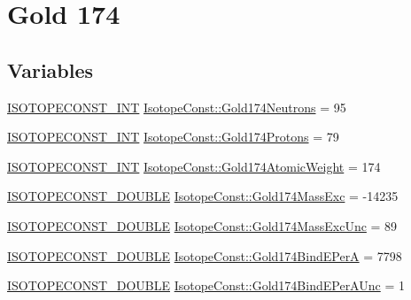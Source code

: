\hypertarget{group___isotope_const-_gold-_au174}{}\section{Gold 174}
\label{group___isotope_const-_gold-_au174}
\subsection*{Variables}
\begin{DoxyCompactItemize}
\item 
\mbox{\hyperlink{group___isotope_const-_macros_ga5f18360b3e99483a35c32d789e62621c}{I\+S\+O\+T\+O\+P\+E\+C\+O\+N\+S\+T\+\_\+\+I\+NT}} \mbox{\hyperlink{group___isotope_const-_gold-_au174_gac1ce7bd28beabdd442582b47f16205e3}{Isotope\+Const\+::\+Gold174\+Neutrons}} = 95
\item 
\mbox{\hyperlink{group___isotope_const-_macros_ga5f18360b3e99483a35c32d789e62621c}{I\+S\+O\+T\+O\+P\+E\+C\+O\+N\+S\+T\+\_\+\+I\+NT}} \mbox{\hyperlink{group___isotope_const-_gold-_au174_gad267fb6573d49a48a0ab21f8a7b635c2}{Isotope\+Const\+::\+Gold174\+Protons}} = 79
\item 
\mbox{\hyperlink{group___isotope_const-_macros_ga5f18360b3e99483a35c32d789e62621c}{I\+S\+O\+T\+O\+P\+E\+C\+O\+N\+S\+T\+\_\+\+I\+NT}} \mbox{\hyperlink{group___isotope_const-_gold-_au174_ga8fef7ecbe47c6800dd0530a676a3bb7c}{Isotope\+Const\+::\+Gold174\+Atomic\+Weight}} = 174
\item 
\mbox{\hyperlink{group___isotope_const-_macros_ga8f45a7272ce02c0b4c65c44636ed719a}{I\+S\+O\+T\+O\+P\+E\+C\+O\+N\+S\+T\+\_\+\+D\+O\+U\+B\+LE}} \mbox{\hyperlink{group___isotope_const-_gold-_au174_gaee66910d89ba2f9655a827065609aada}{Isotope\+Const\+::\+Gold174\+Mass\+Exc}} = -\/14235
\item 
\mbox{\hyperlink{group___isotope_const-_macros_ga8f45a7272ce02c0b4c65c44636ed719a}{I\+S\+O\+T\+O\+P\+E\+C\+O\+N\+S\+T\+\_\+\+D\+O\+U\+B\+LE}} \mbox{\hyperlink{group___isotope_const-_gold-_au174_gad8bb95c6bb87e60864a98564ea0b2782}{Isotope\+Const\+::\+Gold174\+Mass\+Exc\+Unc}} = 89
\item 
\mbox{\hyperlink{group___isotope_const-_macros_ga8f45a7272ce02c0b4c65c44636ed719a}{I\+S\+O\+T\+O\+P\+E\+C\+O\+N\+S\+T\+\_\+\+D\+O\+U\+B\+LE}} \mbox{\hyperlink{group___isotope_const-_gold-_au174_ga9e940a8cd9d781015cb72e7bc87f1711}{Isotope\+Const\+::\+Gold174\+Bind\+E\+PerA}} = 7798
\item 
\mbox{\hyperlink{group___isotope_const-_macros_ga8f45a7272ce02c0b4c65c44636ed719a}{I\+S\+O\+T\+O\+P\+E\+C\+O\+N\+S\+T\+\_\+\+D\+O\+U\+B\+LE}} \mbox{\hyperlink{group___isotope_const-_gold-_au174_gaecf59367a0cdbc20b5cd8839d6553a67}{Isotope\+Const\+::\+Gold174\+Bind\+E\+Per\+A\+Unc}} = 1

\end{DoxyCompactItemize}
